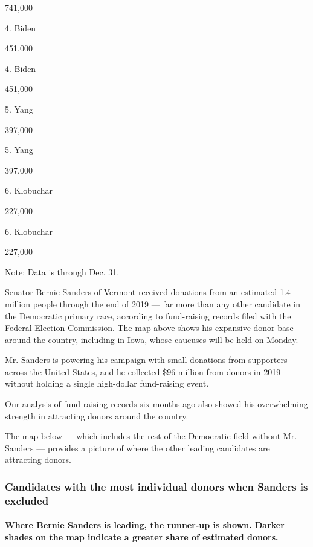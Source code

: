 741,000

4. Biden

451,000

4. Biden

451,000

5. Yang

397,000

5. Yang

397,000

6. Klobuchar

227,000

6. Klobuchar

227,000

Note: Data is through Dec. 31.

Senator
\href{https://www.nytimes.com/interactive/2020/us/elections/bernie-sanders.html}{Bernie
Sanders} of Vermont received donations from an estimated 1.4 million
people through the end of 2019 --- far more than any other candidate in
the Democratic primary race, according to fund-raising records filed
with the Federal Election Commission. The map above shows his expansive
donor base around the country, including in Iowa, whose caucuses will be
held on Monday.

Mr. Sanders is powering his campaign with small donations from
supporters across the United States, and he collected
\href{https://www.nytimes.com/interactive/2020/02/01/us/elections/democratic-q4-fundraising.html}{\$96
million} from donors in 2019 without holding a single high-dollar
fund-raising event.

Our
\href{https://www.nytimes.com/interactive/2019/08/02/us/politics/2020-democratic-fundraising.html}{analysis
of fund-raising records} six months ago also showed his overwhelming
strength in attracting donors around the country.

The map below --- which includes the rest of the Democratic field
without Mr. Sanders --- provides a picture of where the other leading
candidates are attracting donors.

\hypertarget{candidates-with-the-most-individual-donors-when-sanders-is-excluded}{%
\subsubsection{Candidates with the most individual donors when Sanders
is
excluded}\label{candidates-with-the-most-individual-donors-when-sanders-is-excluded}}

\hypertarget{where-bernie-sanders-is-leading-the-runner-up-is-shown-darker-shades-on-the-map-indicate-a-greater-share-of-estimated-donors}{%
\paragraph{Where Bernie Sanders is leading, the runner-up is shown.
Darker shades on the map indicate a greater share of estimated
donors.}\label{where-bernie-sanders-is-leading-the-runner-up-is-shown-darker-shades-on-the-map-indicate-a-greater-share-of-estimated-donors}}

